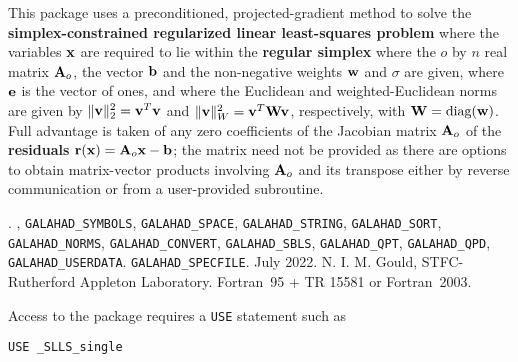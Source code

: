 \documentclass{galahad}
\newcommand{\packagename}{SLLS}
\newcommand{\fullpackagename}{\libraryname\_\packagename}
\begin{document}
\galheader


\galsummary
This package uses a preconditioned, projected-gradient method
to solve the {\bf simplex-constrained regularized linear least-squares problem}
where the variables ${\mathbf{x}}$ are required to lie within the
{\bf regular simplex}
where the $o$ by $n$ real matrix ${\mathbf{A}}_o$, the vector ${\mathbf{b}}$
and the non-negative weights ${\mathbf{w}}$ and $\sigma$ are given, 
where ${\mathbf{e}}$ is the vector of ones, 
and where the Euclidean and weighted-Euclidean norms
are given by $\|{\mathbf{v}}\|_2^2 = {\mathbf{v}}^T {\mathbf{v}}$ and $\|{\mathbf{v}}\|_W^2 = {\mathbf{v}}^T {\mathbf{W}} {\mathbf{v}}$,
respectively, with ${\mathbf{W}} = \mbox{diag}({\mathbf{w}})$.
Full advantage is taken of any zero coefficients of the Jacobian matrix ${\mathbf{A}}_o$
of the {\bf residuals} ${\mathbf{r}}({\mathbf{x}}) = {\mathbf{A}}_o {\mathbf{x}} - {\mathbf{b}}$;
the matrix need not be provided as there are options to obtain matrix-vector
products involving ${\mathbf{A}}_o$ and its transpose either by reverse communication
or from a user-provided subroutine.


\galattributes
\galversions{\tt  \fullpackagename\_single, \fullpackagename\_double}.
,
{\tt GALAHAD\-\_SY\-M\-BOLS},
{\tt GALAHAD\-\_\-SPACE},
{\tt GALAHAD\_STRING},
{\tt GALAHAD\_SORT},
{\tt GALAHAD\_NORMS},
{\tt GALAHAD\_CONVERT},
{\tt GALAHAD\_SBLS},
{\tt GALAHAD\_QPT},
{\tt GALAHAD\_QPD},
{\tt GALAHAD\_USERDATA}.
{\tt GALAHAD\_SPECFILE}.
\galdate July 2022.
\galorigin N. I. M. Gould, STFC-Rutherford Appleton Laboratory.
\gallanguage Fortran~95 + TR 15581 or Fortran~2003.


\galhowto


Access to the package requires a {\tt USE} statement such as

\medskip{}

\hspace{8mm} {\tt USE \fullpackagename\_single}

\medskip{}
\end{document}
